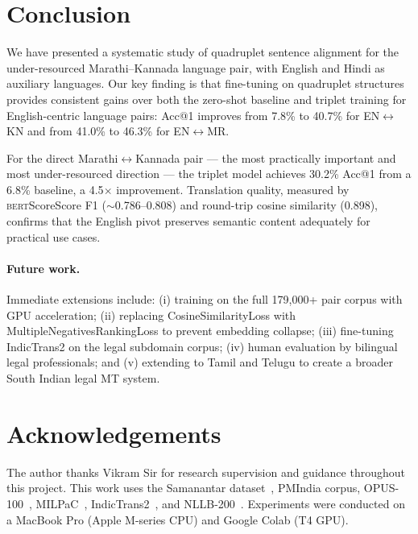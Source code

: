 \documentclass[11pt,a4paper]{article}
\makeatletter
\newcommand{\bert}{\textsc{bert}Score}
\newcommand{\acc}{Acc@1}
\makeatother
\begin{document}
\section{Conclusion}
\label{sec:conclusion}

We have presented a systematic study of quadruplet sentence
alignment for the under-resourced Marathi--Kannada language pair,
with English and Hindi as auxiliary languages.
Our key finding is that fine-tuning on quadruplet structures
provides consistent gains over both the zero-shot baseline and
triplet training for English-centric language pairs:
\acc{} improves from 7.8\% to 40.7\% for EN$\leftrightarrow$KN
and from 41.0\% to 46.3\% for EN$\leftrightarrow$MR.

For the direct Marathi$\leftrightarrow$Kannada pair --- the
most practically important and most under-resourced direction ---
the triplet model achieves 30.2\% \acc{} from a 6.8\% baseline,
a 4.5$\times$ improvement.
Translation quality, measured by \bert{}Score F1 ($\sim$0.786--0.808)
and round-trip cosine similarity (0.898), confirms that the English
pivot preserves semantic content adequately for practical use cases.

\paragraph{Future work.}
Immediate extensions include:
(i) training on the full 179,000+ pair corpus with GPU acceleration;
(ii) replacing CosineSimilarityLoss with
  MultipleNegativesRankingLoss to prevent embedding collapse;
(iii) fine-tuning IndicTrans2 on the legal subdomain corpus;
(iv) human evaluation by bilingual legal professionals; and
(v) extending to Tamil and Telugu to create a broader South
Indian legal MT system.

\section*{Acknowledgements}
The author thanks Vikram Sir for research supervision and
guidance throughout this project.
This work uses the Samanantar dataset~\cite{ramesh2021samanantar},
PMIndia corpus, OPUS-100~\cite{zhang2020opus100},
MILPaC~\cite{milpac2022},
IndicTrans2~\cite{gala2023indictrans2},
and NLLB-200~\cite{nllb2022}.
Experiments were conducted on a MacBook Pro (Apple M-series CPU)
and Google Colab (T4 GPU).




\end{document}
